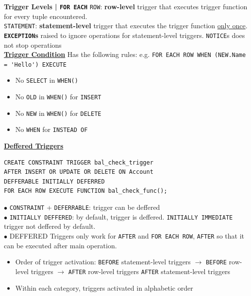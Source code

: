 \documentclass[10pt,landscape]{article}
\begin{document}
\begin{multicols*}{3}
\cprotect\textbf{Trigger Levels | \verb|FOR EACH|}
\verb|ROW|: \textbf{row-level} trigger that executes trigger function for every tuple encountered. \\
\verb|STATEMENT|: \textbf{statement-level} trigger that executes the trigger function \underline{only once}.
\cprotect\textbf{\verb|EXCEPTION|s} raised to ignore operations for statement-level triggers. \verb|NOTICE|s does not stop operations \\ 
\textbf{\underline{Trigger Condition}} Has the following rules: e.g. \verb|FOR EACH ROW WHEN (NEW.Name = 'Hello') EXECUTE|
\begin{multicols*}{2}
    \begin{itemize}[topsep=0pt,noitemsep,wide=0pt, leftmargin=\dimexpr{} + 2\relax]
        \item No \verb|SELECT| in \verb|WHEN()|
        \item No \verb|OLD| in \verb|WHEN()| for \verb|INSERT|
        \item No \verb|NEW| in \verb|WHEN()| for \verb|DELETE|
        \item No \verb|WHEN| for \verb|INSTEAD OF|
    \end{itemize}
\end{multicols*}

\textbf{\underline{Deffered Triggers}}
\begin{lstlisting}
CREATE CONSTRAINT TRIGGER bal_check_trigger
AFTER INSERT OR UPDATE OR DELETE ON Account
DEFFERABLE INITIALLY DEFERRED
FOR EACH ROW EXECUTE FUNCTION bal_check_func();
\end{lstlisting}
$\bullet$ \verb|CONSTRAINT| + \verb|DEFERRABLE|: trigger can be deffered \\
$\bullet$ \verb|INITIALLY DEFFERED|: by default, trigger is deffered. \verb|INITIALLY IMMEDIATE| trigger not deffered by default. \\
$\bullet$ DEFFERED Triggers only work for \verb|AFTER| and \verb|FOR EACH ROW|, \verb|AFTER| so that it can be executed after main operation.



\begin{itemize}[topsep=0pt,noitemsep,wide=0pt, leftmargin=\dimexpr{} + 2\relax]
    \item Order of trigger activation:
     \verb|BEFORE| statement-level triggers $\rightarrow$ \verb|BEFORE| row-level triggers
     $\rightarrow$ \verb|AFTER| row-level triggers  \verb|AFTER| statement-level triggers
    \item Within each category, triggers activated in alphabetic order
\end{itemize}


\end{multicols*}
\end{document}
